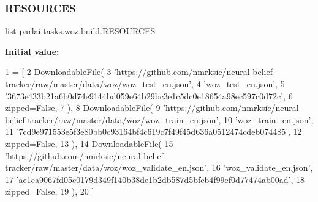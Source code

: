 \subsubsection{\texorpdfstring{R\+E\+S\+O\+U\+R\+C\+ES}{RESOURCES}}
{\footnotesize\ttfamily list parlai.\+tasks.\+woz.\+build.\+R\+E\+S\+O\+U\+R\+C\+ES}

{\bfseries Initial value\+:}
\begin{DoxyCode}
1 =  [
2     DownloadableFile(
3         \textcolor{stringliteral}{'https://github.com/nmrksic/neural-belief-tracker/raw/master/data/woz/woz\_test\_en.json'},
4         \textcolor{stringliteral}{'woz\_test\_en.json'},
5         \textcolor{stringliteral}{'3673e433b21a6b0d74e9144bd059e64b29bc3e1c5dc0e18654a98ec597c0d72c'},
6         zipped=\textcolor{keyword}{False},
7     ),
8     DownloadableFile(
9         \textcolor{stringliteral}{'https://github.com/nmrksic/neural-belief-tracker/raw/master/data/woz/woz\_train\_en.json'},
10         \textcolor{stringliteral}{'woz\_train\_en.json'},
11         \textcolor{stringliteral}{'7cd9e971553e5f3e80bb0c93164bf4c619c7f49f45d636a0512474cdeb074485'},
12         zipped=\textcolor{keyword}{False},
13     ),
14     DownloadableFile(
15         \textcolor{stringliteral}{'https://github.com/nmrksic/neural-belief-tracker/raw/master/data/woz/woz\_validate\_en.json'},
16         \textcolor{stringliteral}{'woz\_validate\_en.json'},
17         \textcolor{stringliteral}{'ae1ea9067fd05c0179d349f140b38de1b2db587d5bfcb4f99ef0d77474ab00ad'},
18         zipped=\textcolor{keyword}{False},
19     ),
20 ]
\end{DoxyCode}
